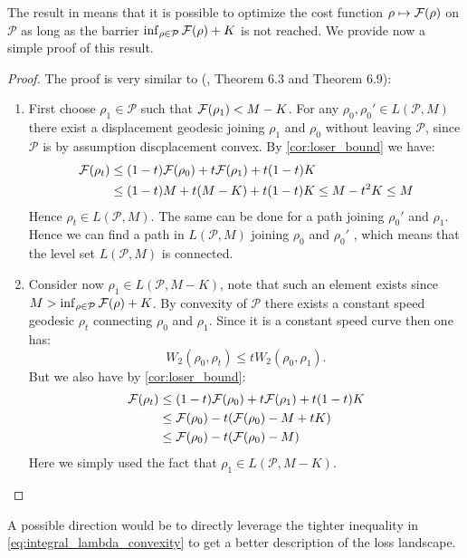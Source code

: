 %
\begin{remark}
The result in  means that it is possible to optimize the cost function $\rho\mapsto {{\mathcal F}}(\rho)$
on $\mathcal{P}$ as long as the barrier $\inf_{\rho\in\mathcal{P}}{{\mathcal F}}(\rho)+K$
is not reached. We provide now a simple proof of this result.
\end{remark}
%
\begin{proof}
The proof is very similar to (\cite{Bottou:2017}, Theorem 6.3 and
Theorem 6.9): 
\begin{enumerate}
\item First choose $\rho_{1}\in\mathcal{P}$ such that ${{\mathcal F}}(\rho_{1})<M-K$.
For any $\rho_{0},\rho_{0}'\in L(\mathcal{P},M)$ there exist a displacement
geodesic joining $\rho_{1}$ and $\rho_{0}$ without leaving $\mathcal{P}$,
since $\mathcal{P}$ is by assumption discplacement convex. By \cref{cor:loser_bound}
we have:
\begin{align*}
{{\mathcal F}}(\rho_{t}) & \leq(1-t){{\mathcal F}}(\rho_{0})+t{{\mathcal F}}(\rho_{1})+t(1-t)K\\
 & \leq(1-t)M+t(M-K)+t(1-t)K\leq M-t^{2}K\leq M
\end{align*}
Hence $\rho_{t}\in L(\mathcal{P},M)$. The same can be done for a
path joining $\rho_{0}'$ and $\rho_{1}$. Hence we can find a path
in $L(\mathcal{P},M)$ joining $\rho_{0}$ and $\rho_{0}'$ , which
means that the level set $L(\mathcal{P},M)$ is connected.
\item Consider now $\rho_{1}\in L(\mathcal{P},M-K)$, note that such an
element exists since $M>\inf_{\rho\in\mathcal{P}}{{\mathcal F}}(\rho)+K$.
By convexity of $\mathcal{P}$ there exists a constant speed geodesic
$\rho_{t}$ connecting $\rho_{0}$ and $\rho_{1}$. Since it is a
constant speed curve then one has:
\[
W_{2}(\rho_{0},\rho_{t})\leq tW_{2}(\rho_{0},\rho_{1}).
\]
But we also have by \cref{cor:loser_bound}:
\begin{align*}
{{\mathcal F}}(\rho_{t}) & \leq(1-t){{\mathcal F}}(\rho_{0})+t{{\mathcal F}}(\rho_{1})+t(1-t)K\\
 & \leq {{\mathcal F}}(\rho_{0})-t({{\mathcal F}}(\rho_{0})-M+tK)\\
 & \leq {{\mathcal F}}(\rho_{0})-t({{\mathcal F}}(\rho_{0})-M)
\end{align*}
Here we simply used the fact that $\rho_{1}\in L(\mathcal{P},M-K)$. 
\end{enumerate}
\end{proof}

\begin{remark}
	A possible direction would be to directly leverage the tighter inequality in \cref{eq:integral_lambda_convexity} to get a better description of the loss landscape.
\end{remark}

